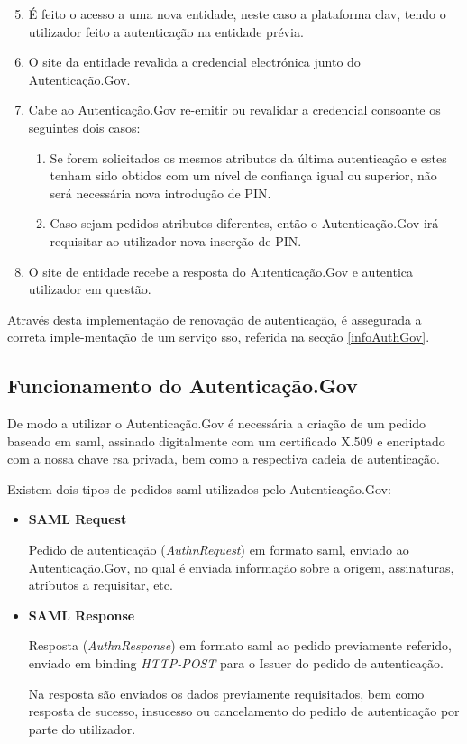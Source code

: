 \begin{enumerate}
    \setcounter{enumi}{4}
    \item É feito o acesso a uma nova entidade, neste caso a plataforma \gls{clav}, tendo o utilizador feito a autenticação na entidade prévia.
    \item O site da entidade revalida a credencial electrónica junto do Autenticação.Gov.
    \item Cabe ao Autenticação.Gov re-emitir ou revalidar a credencial consoante os seguintes dois casos:
    \begin{enumerate}
        \item Se forem solicitados os mesmos atributos da última autenticação e estes tenham sido obtidos com um nível de confiança igual ou superior, não será necessária nova introdução de PIN.
        \item Caso sejam pedidos atributos diferentes, então o Autenticação.Gov irá requisitar ao utilizador nova inserção de PIN.
    \end{enumerate}
    \item O site de entidade recebe a resposta do Autenticação.Gov e autentica utilizador em questão.
\end{enumerate}

Através desta implementação de renovação de autenticação, é assegurada a correta imple-mentação de um serviço \gls{sso}, referida na secção \ref{infoAuthGov}.

\cleardoublepage
\subsection{Funcionamento do Autenticação.Gov}

De modo a utilizar o Autenticação.Gov é necessária a criação de um pedido baseado em \gls{saml}, assinado digitalmente com um certificado X.509 e encriptado com a nossa chave \gls{rsa} privada, bem como a respectiva cadeia de autenticação.

Existem dois tipos de pedidos \gls{saml} utilizados pelo Autenticação.Gov:

\begin{itemize}
    \item \textbf{SAML Request}
    
    Pedido de autenticação (\emph{AuthnRequest}) em formato \gls{saml}, enviado ao Autenticação.Gov, no qual é enviada informação sobre a origem, assinaturas, atributos a requisitar, etc.
    
    \item \textbf{SAML Response}
    
    Resposta (\emph{AuthnResponse}) em formato \gls{saml} ao pedido previamente referido, enviado em binding \emph{HTTP-POST} para o Issuer do pedido de autenticação.
    
    Na resposta são enviados os dados previamente requisitados, bem como resposta de sucesso, insucesso ou cancelamento do pedido de autenticação por parte do utilizador.
\end{itemize}

